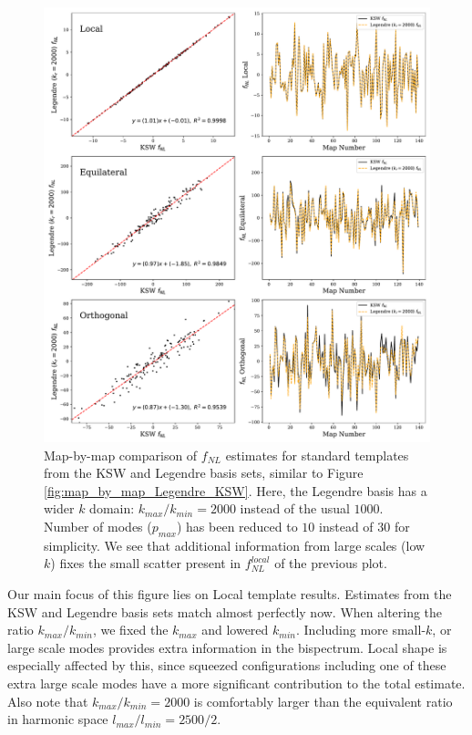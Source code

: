 \begin{figure}[htbp!] 
	\centering    
	\includegraphics[width=\textwidth]{map_by_map_Legendre_KSW_k_ratio_2000.pdf}
	\caption{Map-by-map comparison of $f_{NL}$ estimates for standard templates from the KSW and Legendre basis sets, similar to Figure \ref{fig:map_by_map_Legendre_KSW}. Here, the Legendre basis has a wider $k$ domain: $k_{max}/k_{min} = 2000$ instead of the usual $1000$. Number of modes ($p_{max}$) has been reduced to $10$ instead of $30$ for simplicity. We see that additional information from large scales (low $k$) fixes the small scatter present in $f_{NL}^{local}$ of the previous plot.}
	\label{fig:map_by_map_Legendre_KSW_k_ratio_2000}
\end{figure}

Our main focus of this figure lies on Local template results. Estimates from the KSW and Legendre basis sets match almost perfectly now. When altering the ratio $k_{max}/k_{min}$, we fixed the $k_{max}$ and lowered $k_{min}$. Including more small-$k$, or large scale modes provides extra information in the bispectrum. Local shape is especially affected by this, since squeezed configurations including one of these extra large scale modes have a more significant contribution to the total estimate. Also note that $k_{max} / k_{min} = 2000$ is comfortably larger than the equivalent ratio in harmonic space $l_{max} / l_{min} = 2500 / 2$.

